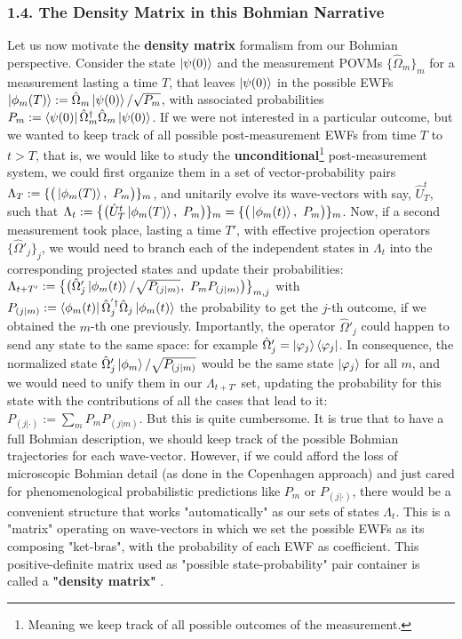 \documentclass[11pt, a4paper]{article} %
\begin{document}
\subsubsection*{1.4. The Density Matrix in this Bohmian Narrative}\vspace{-0.15cm}
Let us now motivate the \textbf{density matrix} formalism from our Bohmian perspective. Consider the state $\ket{\psi(0)}$ and the measurement POVMs $\{\hat{\Omega}_m\}_m$ for a measurement lasting a time $T$, that leaves $\ket{\psi(0)}$ in the possible EWFs $\ket{\phi_m(T)}:=\hat{\Omega}_m\ket{\psi(0)}/\sqrt{P_m}$, with associated probabilities $P_m:=\bra{\psi(0)}\hat{\Omega}_m^\dagger \hat{\Omega}_m\ket{\psi(0)}$. If we were not interested in a particular outcome, but we wanted to keep track of all possible post-measurement EWFs from time $T$ to $t>T$, that is, we would like to study the {\bf unconditional}\footnote{Meaning we keep track of all possible outcomes of the measurement.} post-measurement system, we could first organize them in a set of vector-probability pairs $\Lambda_{T}:=\{\big(\ket{\phi_m(T)},\ P_m\big)\}_m$, and unitarily evolve its wave-vectors with say, $\hat{U}_{T}^{t}$, such that $\Lambda_{t}:=\big\{\big(\hat{U}^t_T\ket{\phi_m(T)},\ P_m\big)\}_m=\{\big(\ket{\phi_m(t)},\ P_m\big)\}_m$. Now, if a second measurement took place, lasting a time $T'$, with effective projection operators $\{\hat{\Omega}'_j\}_j$, we would need to branch each of the independent states in $\Lambda_t$ into the corresponding projected states and update their probabilities: $\Lambda_{t+T'}:=\big\{ \big(\hat{\Omega}_j'\ket{\phi_m(t)}/\sqrt{P_{(j|m)}},\ P_mP_{(j|m)}\big)\big\}_{m,j}$ with $P_{(j|m)}:=\bra{\phi_m(t)}\hat{\Omega}^{'\dagger}_j\hat{\Omega}_j\ket{\phi_m(t)}$ the probability to get the $j$-th outcome, if we obtained the $m$-th one previously. Importantly, the operator $\hat{\Omega}'_j$ could happen to send any state to the same space: for example $\hat{\Omega}'_j=\ket{\varphi_j}\bra{\varphi_j}$. In consequence, the normalized state $\hat{\Omega}'_j \ket{\phi_m}/\sqrt{P_{(j|m)}}$ would be the same state $\ket{\varphi_j}$ for all $m$, and we would need to unify them in our $\Lambda_{t+T'}$ set, updating the probability for this state with the contributions of all the cases that lead to it: $P_{(j|\cdot)}:=\sum_m P_mP_{(j|m)}$. But this is quite cumbersome. It is true that to have a full Bohmian description, we should keep track of the possible Bohmian trajectories for each wave-vector. However, if we could afford the loss of microscopic Bohmian detail (as done in the Copenhagen approach) and just cared for phenomenological probabilistic predictions like $P_m$ or $P_{(j|\cdot)}$, there would be a convenient structure that works "automatically" as our sets of states $\Lambda_t$. This is a "matrix" operating on wave-vectors in which we set the possible EWFs as its composing "ket-bras", with the probability of each EWF as coefficient. This positive-definite matrix used as "possible state-probability" pair container is called a {\bf "density matrix"} \cite{vonNeumann, Durr, Holland}. 
\end{document}
